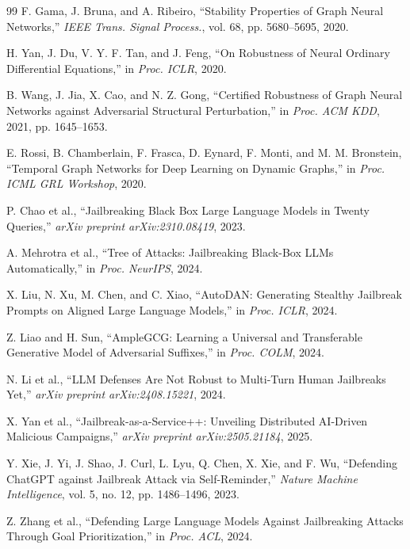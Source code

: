 \documentclass[journal]{IEEEtran}
\theoremstyle{plain}
\theoremstyle{definition}
\theoremstyle{remark}
\begin{document}
\begin{thebibliography}{99}
F. Gama, J. Bruna, and A. Ribeiro, ``Stability Properties of Graph Neural Networks,'' \textit{IEEE Trans. Signal Process.}, vol. 68, pp. 5680--5695, 2020.

H. Yan, J. Du, V. Y. F. Tan, and J. Feng, ``On Robustness of Neural Ordinary Differential Equations,'' in \textit{Proc. ICLR}, 2020.

B. Wang, J. Jia, X. Cao, and N. Z. Gong, ``Certified Robustness of Graph Neural Networks against Adversarial Structural Perturbation,'' in \textit{Proc. ACM KDD}, 2021, pp. 1645--1653.

E. Rossi, B. Chamberlain, F. Frasca, D. Eynard, F. Monti, and M. M. Bronstein, ``Temporal Graph Networks for Deep Learning on Dynamic Graphs,'' in \textit{Proc. ICML GRL Workshop}, 2020.

P. Chao et al., ``Jailbreaking Black Box Large Language Models in Twenty Queries,'' \textit{arXiv preprint arXiv:2310.08419}, 2023.

A. Mehrotra et al., ``Tree of Attacks: Jailbreaking Black-Box LLMs Automatically,'' in \textit{Proc. NeurIPS}, 2024.

X. Liu, N. Xu, M. Chen, and C. Xiao, ``AutoDAN: Generating Stealthy Jailbreak Prompts on Aligned Large Language Models,'' in \textit{Proc. ICLR}, 2024.

Z. Liao and H. Sun, ``AmpleGCG: Learning a Universal and Transferable Generative Model of Adversarial Suffixes,'' in \textit{Proc. COLM}, 2024.

N. Li et al., ``LLM Defenses Are Not Robust to Multi-Turn Human Jailbreaks Yet,'' \textit{arXiv preprint arXiv:2408.15221}, 2024.

X. Yan et al., ``Jailbreak-as-a-Service++: Unveiling Distributed AI-Driven Malicious Campaigns,'' \textit{arXiv preprint arXiv:2505.21184}, 2025.

Y. Xie, J. Yi, J. Shao, J. Curl, L. Lyu, Q. Chen, X. Xie, and F. Wu, ``Defending ChatGPT against Jailbreak Attack via Self-Reminder,'' \textit{Nature Machine Intelligence}, vol. 5, no. 12, pp. 1486--1496, 2023.

Z. Zhang et al., ``Defending Large Language Models Against Jailbreaking Attacks Through Goal Prioritization,'' in \textit{Proc. ACL}, 2024.


\end{thebibliography}
\end{document}
